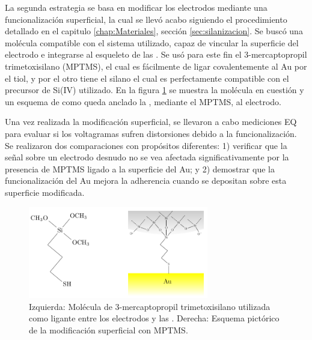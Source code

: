 					
			 La segunda estrategia se basa en modificar los electrodos mediante una funcionalización superficial, la cual se llevó acabo siguiendo el procedimiento detallado en el capitulo \ref{chap:Materiales}, sección \ref{sec:silanizacion}. Se buscó una molécula compatible con el sistema utilizado, capaz de vincular la superficie del electrodo e integrarse al esqueleto de las \pdm. Se usó para este fin el 3-mercaptopropil trimetoxisilano (MPTMS), el cual es fácilmente de ligar covalentemente al Au por el tiol\cite{Gosser,Byun2013}, y por el otro tiene el silano el cual es perfectamente compatible con el precursor de Si(IV) utilizado\cite{Wu2014,Wu2013,Chen2011}. En la figura \ref{fig:mod_sup} se muestra la molécula en cuestión y un esquema de como queda anclado la \pdm, mediante el MPTMS, al electrodo.
		
			 Una vez realizada la modificación superficial, se llevaron a cabo mediciones EQ para evaluar si los voltagramas sufren distorsiones debido a la funcionalización. Se realizaron dos comparaciones con propósitos diferentes: 1) verificar que la señal sobre un electrodo desnudo no se vea afectada significativamente por la presencia de MPTMS ligado a la superficie del Au; y 2) demostrar que la funcionalización del Au mejora la adherencia cuando se depositan \pdm\space sobre esta superficie modificada.

			 \begin{figure}[!ht]
							\begin{center}
							\includegraphics[width=0.70\textwidth]{Esquemas/mod_sup.pdf}
							\caption[Modificación superficial de los electrodos.]{Izquierda: Molécula de  3-mercaptopropil trimetoxisilano utilizada como ligante entre los electrodos y las \pdm. Derecha: Esquema pictórico de la modificación superficial con MPTMS.}
							\label{fig:mod_sup}
							\end{center}
							\end{figure}
										
